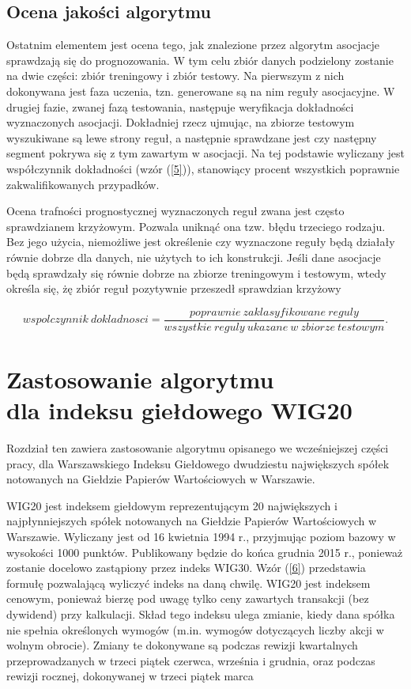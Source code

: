 \documentclass[polish, twoside, 12pt, a4paper]{article}
\theoremstyle{definition}
\theoremstyle{plain}
\theoremstyle{remark}
\begin{document}
\subsection{Ocena jakości algorytmu}

Ostatnim elementem jest ocena tego, jak znalezione przez algorytm asocjacje sprawdzają się do prognozowania. W tym celu zbiór danych podzielony zostanie na dwie części: zbiór treningowy i zbiór testowy. Na 
pierwszym z nich dokonywana jest faza uczenia, tzn. generowane są na nim reguły asocjacyjne. W drugiej fazie, zwanej fazą testowania, następuje weryfikacja dokładności wyznaczonych asocjacji. Dokładniej rzecz 
ujmując, na zbiorze testowym wyszukiwane są lewe strony reguł, a następnie sprawdzane jest czy następny segment pokrywa się z tym zawartym w asocjacji. Na tej podstawie wyliczany jest współczynnik 
dokładności (wzór (\ref{5})), stanowiący procent wszystkich poprawnie zakwalifikowanych przypadków.

Ocena trafności prognostycznej wyznaczonych reguł zwana jest często sprawdzianem krzyżowym. Pozwala uniknąć ona tzw. błędu trzeciego rodzaju. Bez jego użycia, niemożliwe jest określenie czy wyznaczone reguły 
będą działały równie dobrze dla danych, nie użytych to ich konstrukcji. Jeśli dane asocjacje będą sprawdzały się równie dobrze na zbiorze treningowym i testowym, wtedy określa się, żę zbiór reguł pozytywnie przeszedł 
sprawdzian krzyżowy

\begin{equation}\label{5}
wspolczynnik\ dokladnosci= \frac{poprawnie\ zaklasyfikowane\ reguly}{wszystkie\ reguly\ ukazane\ w\ zbiorze\ testowym }.
\end{equation}

\clearpage
\section{Zastosowanie algorytmu \\ dla indeksu giełdowego WIG20}

Rozdział ten zawiera zastosowanie algorytmu opisanego we wcześniejszej części pracy, dla Warszawskiego Indeksu Giełdowego dwudziestu największych spółek notowanych na Giełdzie Papierów Wartościowych w 
Warszawie.

WIG20 jest indeksem giełdowym reprezentującym 20 największych i najpłynniejszych spółek notowanych na Giełdzie Papierów Wartościowych w Warszawie. Wyliczany jest od 16 kwietnia 1994 r., przyjmując poziom bazowy 
w wysokości 1000 punktów. Publikowany będzie do końca grudnia 2015 r., ponieważ zostanie docelowo zastąpiony przez indeks WIG30. Wzór (\ref{6}) przedstawia formułę pozwalającą wyliczyć indeks na daną chwilę. WIG20 jest indeksem cenowym, 
ponieważ bierzę pod uwagę tylko ceny zawartych transakcji (bez dywidend) przy kalkulacji. Skład tego indeksu ulega zmianie, kiedy dana spółka nie spełnia określonych wymogów (m.in. wymogów dotyczących liczby akcji w wolnym obrocie). 
Zmiany te dokonywane są podczas rewizji kwartalnych przeprowadzanych w trzeci piątek czerwca, września i grudnia, oraz podczas rewizji rocznej, dokonywanej w trzeci piątek marca
\end{document}
